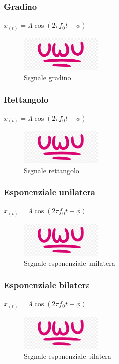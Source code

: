         \subsubsection{Gradino}
        $x_{(t)} = A \cos(2 \pi f_0 t +\phi)$
        \begin{figure}[H]
            \centering
            \includegraphics[width=4cm]{media/uwu.png}
            \caption{Segnale gradino}
            \label{fig:segnale gradino}
        \end{figure}        
        \subsubsection{Rettangolo}
        $x_{(t)} = A \cos(2 \pi f_0 t +\phi)$
        \begin{figure}[H]
            \centering
            \includegraphics[width=4cm]{media/uwu.png}
            \caption{Segnale rettangolo}
            \label{fig:segnale rettangolo}
        \end{figure}        
        \subsubsection{Esponenziale unilatera}
        $x_{(t)} = A \cos(2 \pi f_0 t +\phi)$
        \begin{figure}[H]
            \centering
            \includegraphics[width=4cm]{media/uwu.png}
            \caption{Segnale esponenziale unilatera}
            \label{fig:segnale esponenziale unilatera}
        \end{figure}        
        \subsubsection{Esponenziale bilatera}
        $x_{(t)} = A \cos(2 \pi f_0 t +\phi)$
        \begin{figure}[H]
            \centering
            \includegraphics[width=4cm]{media/uwu.png}
            \caption{Segnale esponenziale bilatera}
            \label{fig:segnale esponenziale bilatera}
        \end{figure}        
